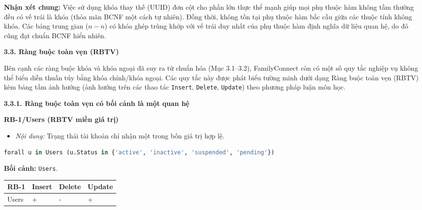 \vspace{0.8em}
\noindent\textbf{Nhận xét chung:} Việc sử dụng khóa thay thế (UUID) đơn cột cho phần lớn thực thể mạnh giúp mọi phụ thuộc hàm không tầm thường đều có vế trái là khóa (thỏa mãn BCNF một cách tự nhiên). Đồng thời, không tồn tại phụ thuộc hàm bắc cầu giữa các thuộc tính không khóa. Các bảng trung gian ($n-n$) có khóa ghép trùng khớp với vế trái duy nhất của phụ thuộc hàm định nghĩa dữ liệu quan hệ, do đó cũng đạt chuẩn BCNF hiển nhiên.

\vspace{1.8em}
{}
{\Large\bfseries 3.3. Ràng buộc toàn vẹn (RBTV)}\par\vspace{0.8em}

Bên cạnh các ràng buộc khóa và khóa ngoại đã suy ra từ chuẩn hóa (Mục 3.1–3.2), FamilyConnect còn có một số quy tắc nghiệp vụ không thể biểu diễn thuần túy bằng khóa chính/khóa ngoại. Các quy tắc này được phát biểu tường minh dưới dạng Ràng buộc toàn vẹn (RBTV) kèm bảng tầm ảnh hưởng (ảnh hưởng trên các thao tác \texttt{Insert}, \texttt{Delete}, \texttt{Update}) theo phương pháp luận môn học.

\vspace{1.4em}
{}
{\large\bfseries 3.3.1. Ràng buộc toàn vẹn có bối cảnh là một quan hệ}\par\vspace{0.6em}

\textbf{RB-1/Users (RBTV miền giá trị)}
\begin{itemize}
	\item \emph{Nội dung:} Trạng thái tài khoản chỉ nhận một trong bốn giá trị hợp lệ.
\end{itemize}

\begin{lstlisting}[language=SQL]
	forall u in Users (u.Status in {'active', 'inactive', 'suspended', 'pending'})
\end{lstlisting}
\noindent\textbf{Bối cảnh:} \texttt{Users}.

\vspace{0.4em}
{\centering
	\renewcommand{\arraystretch}{1.2}
	\begin{tabular}{|>{\raggedright\arraybackslash}p{}|>{\centering\arraybackslash}p{}|>{\centering\arraybackslash}p{}|>{\centering\arraybackslash}p{}|}
		\hline
		\textbf{RB-1} & \textbf{Insert} & \textbf{Delete} & \textbf{Update} \\ \hline
		Users & + & - & + \\ \hline
	\end{tabular}\par}

